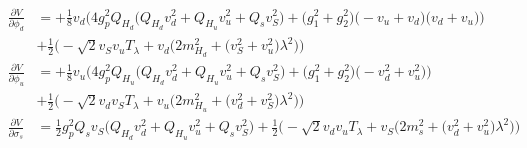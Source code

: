 \begin{align} 
\frac{\partial V}{\partial \phi_{d}} &= +\frac{1}{8} v_d \Big(4 g_{p}^{2} Q_{H_d} \Big(Q_{H_d} v_{d}^{2}  + Q_{H_u} v_{u}^{2}  + Q_s v_{S}^{2} \Big) + \Big(g_{1}^{2} + g_{2}^{2}\Big)\Big(- v_u  + v_d\Big)\Big(v_d + v_u\Big)\Big)\nonumber \\ 
 &+\frac{1}{2} \Big(- \sqrt{2} v_S v_u T_{\lambda}  + v_d \Big(2 m_{H_d}^2  + \Big(v_{S}^{2} + v_{u}^{2}\Big)\lambda^{2} \Big)\Big)\\ 
\frac{\partial V}{\partial \phi_{u}} &= +\frac{1}{8} v_u \Big(4 g_{p}^{2} Q_{H_u} \Big(Q_{H_d} v_{d}^{2}  + Q_{H_u} v_{u}^{2}  + Q_s v_{S}^{2} \Big) + \Big(g_{1}^{2} + g_{2}^{2}\Big)\Big(- v_{d}^{2}  + v_{u}^{2}\Big)\Big)\nonumber \\ 
 &+\frac{1}{2} \Big(- \sqrt{2} v_d v_S T_{\lambda}  + v_u \Big(2 m_{H_u}^2  + \Big(v_{d}^{2} + v_{S}^{2}\Big)\lambda^{2} \Big)\Big)\\ 
\frac{\partial V}{\partial \sigma_s} &= \frac{1}{2} g_{p}^{2} Q_s v_S \Big(Q_{H_d} v_{d}^{2}  + Q_{H_u} v_{u}^{2}  + Q_s v_{S}^{2} \Big) + \frac{1}{2} \Big(- \sqrt{2} v_d v_u T_{\lambda}  + v_S \Big(2 m^2_{s}  + \Big(v_{d}^{2} + v_{u}^{2}\Big)\lambda^{2} \Big)\Big)
\end{align} 
